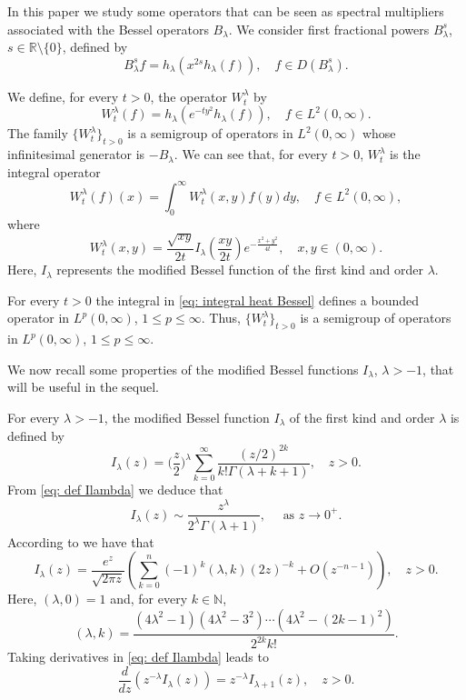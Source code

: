 \documentclass[a4paper,10pt, reqno]{amsart}
\theoremstyle{definition}
\theoremstyle{remark}
\numberwithin{equation}{section}
\begin{document}
In this paper we study some operators that can be seen as spectral multipliers associated with the Bessel operators $B_\lambda$. We consider first fractional powers $B_\lambda^s$, $s\in \mathbb R\setminus\{0\}$, defined by
\[
B_\lambda^sf=h_\lambda (x^{2s}h_\lambda (f)),\quad f\in D(B_\lambda^s).
\]


We define, for every $t>0$, the operator $W_t^\lambda$ by
\[
W_t^\lambda (f)=h_\lambda (e^{-ty^2}h_\lambda (f)),\quad f\in L^2(0,\infty).
\]
The family $\{W_t^\lambda \}_{t>0}$ is a semigroup of operators in $L^2(0,\infty)$ whose infinitesimal generator is $-B_\lambda$. We can see that, for every $t>0$, $W_t^\lambda$  is the integral operator
\begin{equation}\label{eq: integral heat Bessel}
    W_t^\lambda (f)(x)=\int_0^\infty W_t^\lambda (x,y)f(y)dy,\quad f\in L^2(0,\infty),
\end{equation}
where 
\[
W_t^\lambda (x,y)=\frac{\sqrt{xy}}{2t}I_\lambda \left(\frac{xy}{2t}\right)e^{-\frac{x^2+y^2}{4t}},\quad x,y \in (0,\infty).
\]
Here, $I_\lambda$ represents the modified Bessel function of the first kind and order $\lambda$.

For every $t>0$ the integral in \eqref{eq: integral heat Bessel} defines a bounded operator in $L^p(0,\infty)$, $1\leq p\leq \infty$. Thus, $\{W_t^\lambda \}_{t>0}$ is a semigroup of operators in $L^p(0,\infty)$, $1\leq p\leq \infty$.


We now recall some properties of the modified Bessel functions $I_\lambda$, $\lambda >-1$, that will be useful in the sequel.

For every $\lambda >-1$, the modified Bessel function $I_\lambda$ of the first kind and order $\lambda$ is defined by
\begin{equation}\label{eq: def Ilambda}
I_\lambda (z)=\Big(\frac{z}{2}\Big)^\lambda \sum_{k=0}^\infty \frac{(z/2)^{2k}}{k!\Gamma (\lambda +k+1)},\quad z>0.
\end{equation}
From \eqref{eq: def Ilambda} we deduce that
\begin{equation}\label{eq: Ilambda at zero}
I_\lambda (z)\sim \frac{z^\lambda }{2^\lambda\Gamma (\lambda +1)},\quad \mbox{ as }z\rightarrow 0^+.
\end{equation}
According to \cite[(5.11.10)]{Le} we have that
\begin{equation}\label{eq: Ilambda at infty}
I_\lambda (z)=\frac{e^z}{\sqrt{2\pi z}}\left(\sum_{k=0}^n(-1)^k(\lambda, k)(2z)^{-k}+O(z^{-n-1})\right),\quad z>0.
\end{equation}
Here, $(\lambda ,0)=1$ and, for every $k\in \mathbb N$,
\[
(\lambda,k)=\frac{(4\lambda^2-1)(4\lambda^2-3^2)\cdots (4\lambda^2-(2k-1)^2)}{2^{2k}k!}.
\]
Taking derivatives in \eqref{eq: def Ilambda} leads to
\begin{equation}\label{eq: Ilambda derivative}
\frac{d}{dz}(z^{-\lambda }I_\lambda (z))=z^{-\lambda }I_{\lambda +1}(z),\quad z>0.
\end{equation}
\end{document}
